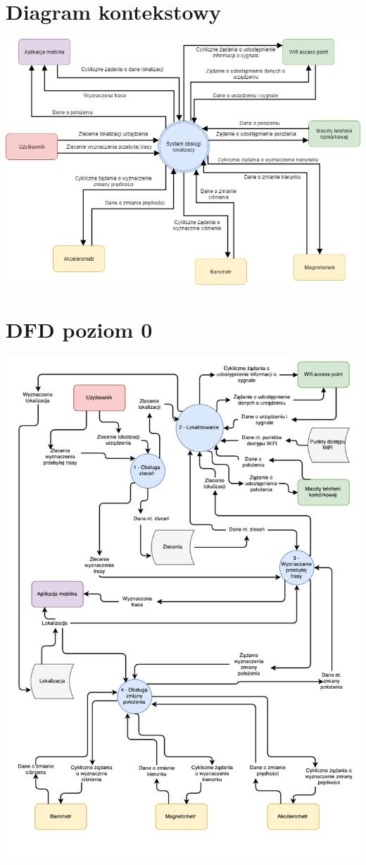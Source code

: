 \documentclass[11pt]{article}
\begin{document}
	\section{Diagram kontekstowy}
    \begin{center}
	\includegraphics[scale=0.6]{DiagramKontekstowy.png}
	\end{center}
	\newpage
	\section{DFD poziom 0}
	\begin{center}
		\includegraphics[scale=0.8]{DFD0.pdf}
	\end{center}
	\newpage
\end{document}
